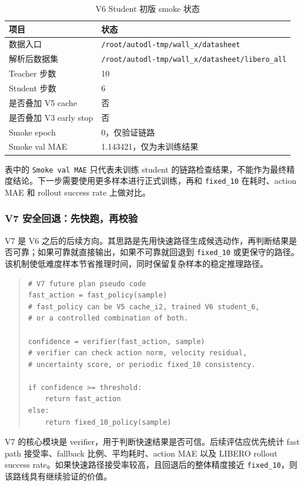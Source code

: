\documentclass[UTF8,a4paper,12pt]{ctexart}
\begin{document}
\begin{table}[htbp]
\centering
\small
\caption{V6 Student 初版 smoke 状态}
\begin{tabular}{ll}
\toprule
项目 & 状态 \\
\midrule
数据入口 & \texttt{/root/autodl-tmp/wall\_x/datasheet} \\
解析后数据集 & \texttt{/root/autodl-tmp/wall\_x/datasheet/libero\_all} \\
Teacher 步数 & 10 \\
Student 步数 & 6 \\
是否叠加 V5 cache & 否 \\
是否叠加 V3 early stop & 否 \\
Smoke epoch & 0，仅验证链路 \\
Smoke val MAE & 1.143421，仅为未训练结果 \\
\bottomrule
\end{tabular}
\end{table}

表中的 \texttt{Smoke val MAE} 只代表未训练 student 的链路检查结果，不能作为最终精度结论。下一步需要使用更多样本进行正式训练，再和 \texttt{fixed\_10} 在耗时、action MAE 和 rollout success rate 上做对比。

\subsubsection{V7 安全回退：先快跑，再校验}

V7 是 V6 之后的后续方向。其思路是先用快速路径生成候选动作，再判断结果是否可靠；如果可靠就直接输出，如果不可靠就回退到 \texttt{fixed\_10} 或更保守的路径。该机制使低难度样本节省推理时间，同时保留复杂样本的稳定推理路径。

\begin{quote}\small
\begin{verbatim}
# V7 future plan pseudo code
fast_action = fast_policy(sample)
# fast_policy can be V5 cache_i2, trained V6 student_6,
# or a controlled combination of both.

confidence = verifier(fast_action, sample)
# verifier can check action norm, velocity residual,
# uncertainty score, or periodic fixed_10 consistency.

if confidence >= threshold:
    return fast_action
else:
    return fixed_10_policy(sample)
\end{verbatim}
\end{quote}

V7 的核心模块是 verifier，用于判断快速结果是否可信。后续评估应优先统计 fast path 接受率、fallback 比例、平均耗时、action MAE 以及 LIBERO rollout success rate。如果快速路径接受率较高，且回退后的整体精度接近 \texttt{fixed\_10}，则该路线具有继续验证的价值。
\end{document}
